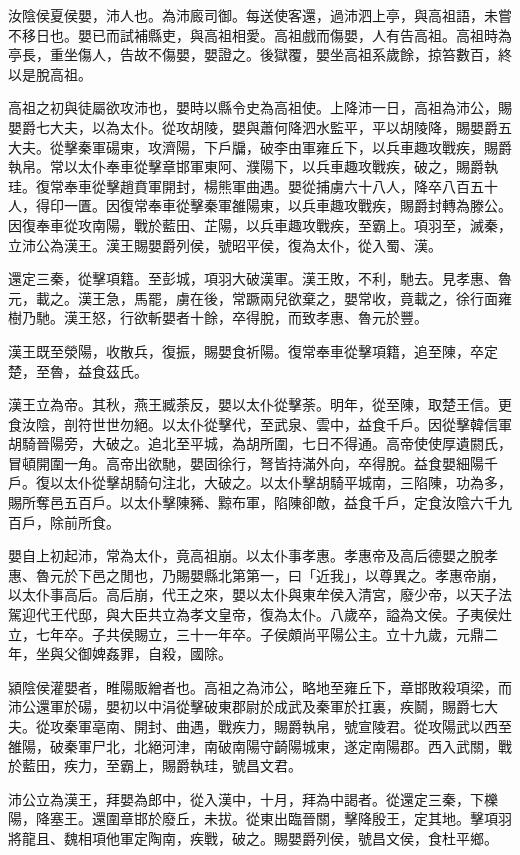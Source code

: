 \begin{pinyinscope}
汝陰侯夏侯嬰，沛人也。為沛廄司御。每送使客還，過沛泗上亭，與高祖語，未嘗不移日也。嬰已而試補縣吏，與高祖相愛。高祖戲而傷嬰，人有告高祖。高祖時為亭長，重坐傷人，告故不傷嬰，嬰證之。後獄覆，嬰坐高祖系歲餘，掠笞數百，終以是脫高祖。

高祖之初與徒屬欲攻沛也，嬰時以縣令史為高祖使。上降沛一日，高祖為沛公，賜嬰爵七大夫，以為太仆。從攻胡陵，嬰與蕭何降泗水監平，平以胡陵降，賜嬰爵五大夫。從擊秦軍碭東，攻濟陽，下戶牖，破李由軍雍丘下，以兵車趣攻戰疾，賜爵執帛。常以太仆奉車從擊章邯軍東阿、濮陽下，以兵車趣攻戰疾，破之，賜爵執珪。復常奉車從擊趙賁軍開封，楊熊軍曲遇。嬰從捕虜六十八人，降卒八百五十人，得印一匱。因復常奉車從擊秦軍雒陽東，以兵車趣攻戰疾，賜爵封轉為滕公。因復奉車從攻南陽，戰於藍田、芷陽，以兵車趣攻戰疾，至霸上。項羽至，滅秦，立沛公為漢王。漢王賜嬰爵列侯，號昭平侯，復為太仆，從入蜀、漢。

還定三秦，從擊項籍。至彭城，項羽大破漢軍。漢王敗，不利，馳去。見孝惠、魯元，載之。漢王急，馬罷，虜在後，常蹶兩兒欲棄之，嬰常收，竟載之，徐行面雍樹乃馳。漢王怒，行欲斬嬰者十餘，卒得脫，而致孝惠、魯元於豐。

漢王既至滎陽，收散兵，復振，賜嬰食祈陽。復常奉車從擊項籍，追至陳，卒定楚，至魯，益食茲氏。

漢王立為帝。其秋，燕王臧荼反，嬰以太仆從擊荼。明年，從至陳，取楚王信。更食汝陰，剖符世世勿絕。以太仆從擊代，至武泉、雲中，益食千戶。因從擊韓信軍胡騎晉陽旁，大破之。追北至平城，為胡所圍，七日不得通。高帝使使厚遺閼氏，冒頓開圍一角。高帝出欲馳，嬰固徐行，弩皆持滿外向，卒得脫。益食嬰細陽千戶。復以太仆從擊胡騎句注北，大破之。以太仆擊胡騎平城南，三陷陳，功為多，賜所奪邑五百戶。以太仆擊陳豨、黥布軍，陷陳卻敵，益食千戶，定食汝陰六千九百戶，除前所食。

嬰自上初起沛，常為太仆，竟高祖崩。以太仆事孝惠。孝惠帝及高后德嬰之脫孝惠、魯元於下邑之閒也，乃賜嬰縣北第第一，曰「近我」，以尊異之。孝惠帝崩，以太仆事高后。高后崩，代王之來，嬰以太仆與東牟侯入清宮，廢少帝，以天子法駕迎代王代邸，與大臣共立為孝文皇帝，復為太仆。八歲卒，謚為文侯。子夷侯灶立，七年卒。子共侯賜立，三十一年卒。子侯頗尚平陽公主。立十九歲，元鼎二年，坐與父御婢姦罪，自殺，國除。

潁陰侯灌嬰者，睢陽販繒者也。高祖之為沛公，略地至雍丘下，章邯敗殺項梁，而沛公還軍於碭，嬰初以中涓從擊破東郡尉於成武及秦軍於扛裏，疾鬬，賜爵七大夫。從攻秦軍亳南、開封、曲遇，戰疾力，賜爵執帛，號宣陵君。從攻陽武以西至雒陽，破秦軍尸北，北絕河津，南破南陽守齮陽城東，遂定南陽郡。西入武關，戰於藍田，疾力，至霸上，賜爵執珪，號昌文君。

沛公立為漢王，拜嬰為郎中，從入漢中，十月，拜為中謁者。從還定三秦，下櫟陽，降塞王。還圍章邯於廢丘，未拔。從東出臨晉關，擊降殷王，定其地。擊項羽將龍且、魏相項他軍定陶南，疾戰，破之。賜嬰爵列侯，號昌文侯，食杜平鄉。


\end{pinyinscope}
